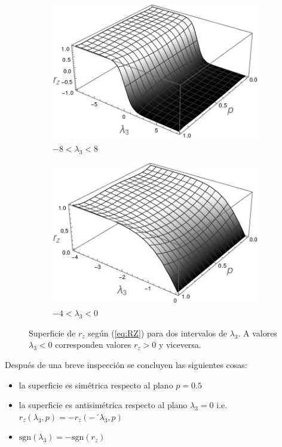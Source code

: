 \begin{figure}[h!]
\centering
\begin{subfigure}{0.475\textwidth}
  \centering
  \includegraphics[width=0.6\linewidth]{maxent/figures/LagrangeMult_lambda-8to8.png}
  \caption{$-8<\lambda_{3}<8$}
\end{subfigure}%
\begin{subfigure}{0.475\textwidth}
  \centering
  \includegraphics[width=0.6\linewidth]{maxent/figures/LagrangeMult_lambda-4to0.png}
  \caption{$-4<\lambda_{3}<0$}
\end{subfigure}
\caption{Superficie de $r_{z}$ según (\ref{eq:RZ}) para dos intervalos de $\lambda_{3}$. A valores $\lambda_{3}<0$ corresponden valores $r_{z}>0$ y viceversa.}
\label{fig:rzsurf}
\end{figure}

Después de una breve inspección se concluyen las siguientes cosas:
\begin{itemize}
\item la superficie es simétrica respecto al plano $p=0.5$
\item la superficie es antisimétrica  respecto al plano $\lambda_{3}=0$ i.e. $r_{z
}(\lambda_{3},p)=-r_{z
}(-´\lambda_{3},p)$
\item $\text{sgn}(\lambda_{3})=-\text{sgn}(r_{z})$
\end{itemize}

